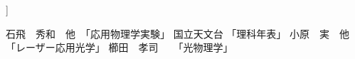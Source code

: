 \documentclass[11pt, a4paper,twocolumn]{jarticle}
\begin{document}
\vspace{30truept}
]
 





\begin{thebibliography}{9}
   石飛　秀和　他　「応用物理学実験」
   国立天文台  「理科年表」
   小原　実　他　「レーザー応用光学」
   櫛田　孝司　　「光物理学」　
\end{thebibliography}
\end{document}
